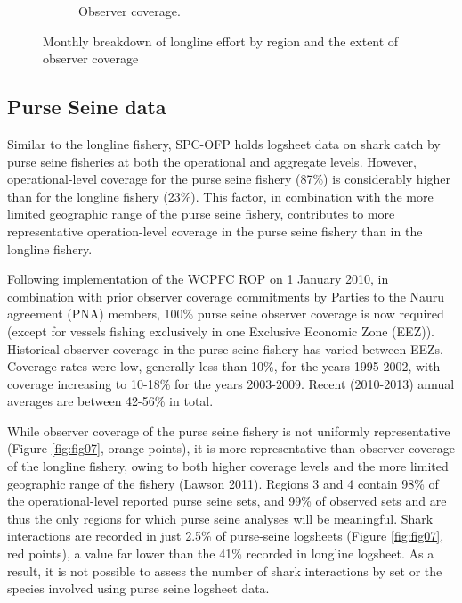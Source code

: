 \documentclass[12pt]{SCreport}
\begin{document}
\begin{landscape}
\begin{figure}
\begin{subfigure}[b]{0.6\textwidth}
       \caption{Observer coverage.}
       \label{fig:test2}
   \end{subfigure}
\caption{Monthly breakdown of longline effort by region and the extent of observer coverage}
\label{fig:fig06} 
\end{figure}
\end{landscape}

\clearpage
 
 
 \subsection{Purse Seine data} 
Similar to the longline fishery, SPC-OFP holds logsheet data on shark catch by purse seine fisheries at both the operational and aggregate levels.  However, operational-level coverage for the purse seine fishery (87\%) is considerably higher than for the longline fishery (23\%). This factor, in combination with the more limited geographic range of the purse seine fishery, contributes to more representative operation-level coverage in the purse seine fishery than in the longline fishery.

Following implementation of the WCPFC ROP on 1 January 2010, in combination with prior observer coverage commitments by Parties to the Nauru agreement (PNA) members, 100\% purse seine observer coverage is now required (except for vessels fishing exclusively in one Exclusive Economic Zone (EEZ)). Historical observer coverage in the purse seine fishery has varied between EEZs. Coverage rates were low, generally less than 10\%, for the years 1995-2002, with coverage increasing to 10-18\% for the years 2003-2009. Recent (2010-2013) annual averages are between 42-56\% in total.


While observer coverage of the purse seine fishery is not uniformly representative (Figure \ref{fig:fig07}, orange points), it is more representative than observer coverage of the longline fishery, owing to both higher coverage levels and the more limited geographic range of the fishery (Lawson 2011). Regions 3 and 4 contain 98\% of the operational-level reported purse seine sets, and 99\% of observed sets and are thus the only regions for which purse seine analyses will be meaningful. Shark interactions are recorded in just 2.5\% of purse-seine logsheets (Figure \ref{fig:fig07}, red points), a value far lower than the 41\% recorded in longline logsheet. As a result, it is not possible to assess the number of shark interactions by set or the species involved using purse seine logsheet data.
\end{document}
